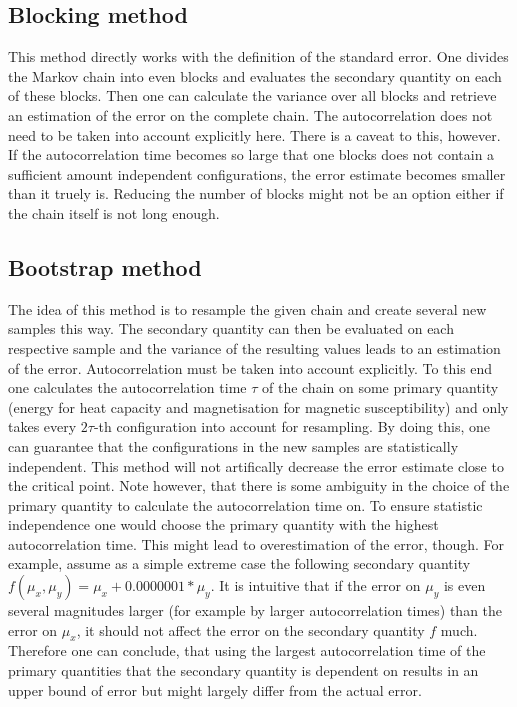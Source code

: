 \documentclass[11pt, a4paper]{scrartcl}
\begin{document}
\subsection{Blocking method}
    This method directly works with the definition of the standard error. One divides the Markov chain into even blocks and evaluates the secondary quantity on each of these blocks. Then one can calculate the variance over all blocks and retrieve an estimation of the error on the complete chain. The autocorrelation does not need to be taken into account explicitly here. There is a caveat to this, however. If the autocorrelation time becomes so large that one blocks does not contain a sufficient amount independent configurations, the error estimate becomes smaller than it truely is. Reducing the number of blocks might not be an option either if the chain itself is not long enough.
\subsection{Bootstrap method}
    The idea of this method is to resample the given chain and create several new samples this way. The secondary quantity can then be evaluated on each respective sample and the variance of the resulting values leads to an estimation of the error. Autocorrelation must be taken into account explicitly. To this end one calculates the autocorrelation time $\tau$ of the chain on some primary quantity (energy for heat capacity and magnetisation for magnetic susceptibility) and only takes every $2\tau$-th configuration into account for resampling. By doing this, one can guarantee that the configurations in the new samples are statistically independent. This method will not artifically decrease the error estimate close to the critical point. Note however, that there is some ambiguity in the choice of the primary quantity to calculate the autocorrelation time on. To ensure statistic independence one would choose the primary quantity with the highest autocorrelation time. This might lead to overestimation of the error, though. For example, assume as a simple extreme case the following secondary quantity $f(\mu_x,\mu_y) = \mu_x + 0.0000001 * \mu_y$. It is intuitive that if the error on $\mu_y$ is even several magnitudes larger (for example by larger autocorrelation times) than the error on $\mu_x$, it should not affect the error on the secondary quantity $f$ much. Therefore one can conclude, that using the largest autocorrelation time of the primary quantities that the secondary quantity is dependent on results in an upper bound of error but might largely differ from the actual error.
\end{document}
